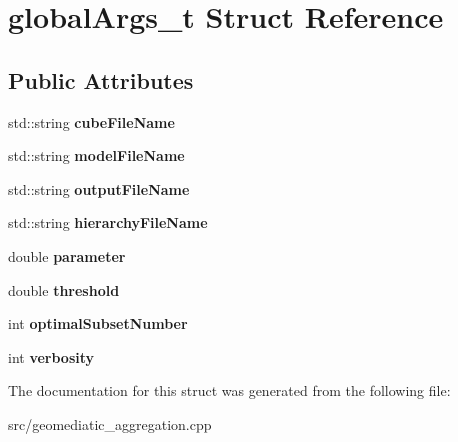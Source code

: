 \hypertarget{structglobalArgs__t}{\section{global\-Args\-\_\-t Struct Reference}
\label{structglobalArgs__t}
}
\subsection*{Public Attributes}
\begin{DoxyCompactItemize}
\item 
\hypertarget{structglobalArgs__t_adf88287196342d2b632945ea3e8842d5}{std\-::string {\bfseries cube\-File\-Name}}\label{structglobalArgs__t_adf88287196342d2b632945ea3e8842d5}

\item 
\hypertarget{structglobalArgs__t_a4da5e4f78c56a5f242d7361fce1871da}{std\-::string {\bfseries model\-File\-Name}}\label{structglobalArgs__t_a4da5e4f78c56a5f242d7361fce1871da}

\item 
\hypertarget{structglobalArgs__t_a16663cb513cedaa94ac5cefc16097f10}{std\-::string {\bfseries output\-File\-Name}}\label{structglobalArgs__t_a16663cb513cedaa94ac5cefc16097f10}

\item 
\hypertarget{structglobalArgs__t_a50c7b2a067b62015bd533d41fe2b31ba}{std\-::string {\bfseries hierarchy\-File\-Name}}\label{structglobalArgs__t_a50c7b2a067b62015bd533d41fe2b31ba}

\item 
\hypertarget{structglobalArgs__t_a1414ab4a318d71427689272a43764089}{double {\bfseries parameter}}\label{structglobalArgs__t_a1414ab4a318d71427689272a43764089}

\item 
\hypertarget{structglobalArgs__t_a04175c4d5386a4bb971347ff6d297c3a}{double {\bfseries threshold}}\label{structglobalArgs__t_a04175c4d5386a4bb971347ff6d297c3a}

\item 
\hypertarget{structglobalArgs__t_af52d4eaf68161829ddf58a3fdd90f072}{int {\bfseries optimal\-Subset\-Number}}\label{structglobalArgs__t_af52d4eaf68161829ddf58a3fdd90f072}

\item 
\hypertarget{structglobalArgs__t_ad819d1371481744e24bbe743be0b633a}{int {\bfseries verbosity}}\label{structglobalArgs__t_ad819d1371481744e24bbe743be0b633a}

\end{DoxyCompactItemize}


The documentation for this struct was generated from the following file\-:\begin{DoxyCompactItemize}
\item 
src/geomediatic\-\_\-aggregation.\-cpp\end{DoxyCompactItemize}
